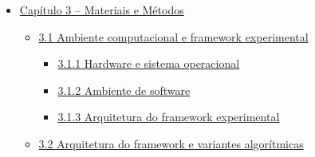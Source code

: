 \begin{itemize}
\begin{itemize}
\begin{itemize}
      \begin{itemize}
      \tightlist
      \item
        \hyperref[sec-251-ga-2opt]{2.5.1 Algoritmo Genético + \(2\)-opt}
      \end{itemize}
    \item
      \hyperref[sec-26-gpu-metaheuristicas]{2.6 Computação em GPU e
      paralelização de meta-heurísticas}

      \begin{itemize}
      \tightlist
      \item
        \hyperref[sec-261-taxonomia-paralelizacao]{2.6.1 Taxonomia de
        paralelização segundo Crainic e Toulouse}
      \item
        \hyperref[sec-262-gpu-aplicacoes-tsp]{2.6.2 Aplicações de GPU a
        meta-heurísticas para o TSP}
      \item
        \hyperref[sec-263-cpu-vs-gpu]{2.6.3 Contraste arquitetural: CPU
        vs GPU}
      \end{itemize}
    \item
      \hyperref[sec-27-comparacao-estatistica]{2.7 Comparação
      estatística de algoritmos de otimização}

      \begin{itemize}
      \tightlist
      \item
        \hyperref[sec-271-comparacoes-pareadas]{2.7.1 Comparações
        pareadas}
      \item
        \hyperref[sec-272-comparacoes-multiplas]{2.7.2 Comparações
        múltiplas}
      \end{itemize}
    \end{itemize}
  \end{itemize}
\item
  \hyperref[cap3-materiais-metodos]{Capítulo 3 -- Materiais e Métodos}

  \begin{itemize}
  \tightlist
  \item
    \hyperref[sec-31-ambiente-framework]{3.1 Ambiente computacional e
    framework experimental}

    \begin{itemize}
    \tightlist
    \item
      \hyperref[sec-311-hardware-software]{3.1.1 Hardware e sistema
      operacional}
    \item
      \hyperref[sec-312-ambiente-software]{3.1.2 Ambiente de software}
    \item
      \hyperref[sec-313-arquitetura-framework]{3.1.3 Arquitetura do
      framework experimental}
    \end{itemize}
  \item
    \hyperref[sec-32-arquitetura-variantes]{3.2 Arquitetura do framework
    e variantes algorítmicas}


\end{itemize}
\end{itemize}
